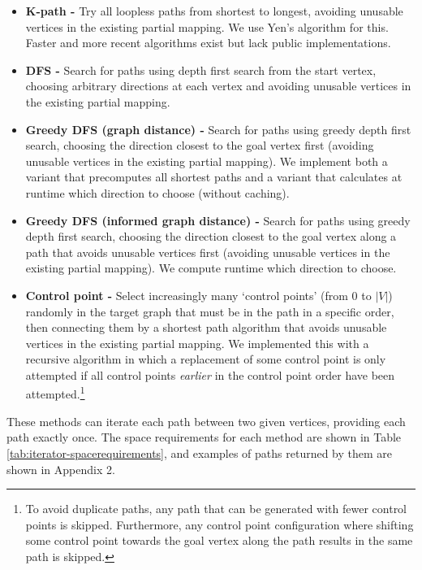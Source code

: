 \begin{itemize}
\item \textbf{K-path -} Try all loopless paths from shortest to longest, avoiding unusable vertices in the existing partial mapping. We use Yen's algorithm \cite{YensAlgorithm} for this. Faster and more recent algorithms exist \cite{Hershberger, Brander1996} but lack public implementations.

\item \textbf{DFS -} Search for paths using depth first search from the start vertex, choosing arbitrary directions at each vertex and avoiding unusable vertices in the existing partial mapping.

\item \textbf{Greedy DFS (graph distance) -} Search for paths using greedy depth first search, choosing the direction closest to the goal vertex first (avoiding unusable vertices in the existing partial mapping). We implement both a variant that precomputes all shortest paths and a variant that calculates at runtime which direction to choose (without caching).

\item \textbf{Greedy DFS (informed graph distance) -} Search for paths using greedy depth first search, choosing the direction closest to the goal vertex along a path that avoids unusable vertices first (avoiding unusable vertices in the existing partial mapping). We compute runtime which direction to choose.

\item \textbf{Control point -} Select increasingly many `control points' (from $0$ to $|V|$) randomly in the target graph that must be in the path in a specific order, then connecting them by a shortest path algorithm that avoids unusable vertices in the existing partial mapping. We implemented this with a recursive algorithm in which a replacement of some control point is only attempted if all control points \textit{earlier} in the control point order have been attempted.\footnote{To avoid duplicate paths, any path that can be generated with fewer control points is skipped. Furthermore, any control point configuration where shifting some control point towards the goal vertex along the path results in the same path is skipped.}
\end{itemize}

These methods can iterate each path between two given vertices, providing each path exactly once. The space requirements for each method are shown in Table \ref{tab:iterator-spacerequirements}, and examples of paths returned by them are shown in Appendix 2.

